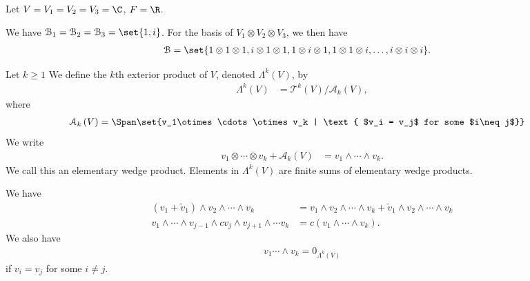 \documentclass[10pt]{mypackage}
\begin{document}
  \begin{example}
    Let $V = V_1 = V_2 = V_3 = \C$, $F = \R$.\newline

    We have $\mathcal{B}_1 = \mathcal{B}_2 =\mathcal{B}_3 = \set{1,i}$. For the basis of $V_1\otimes V_2\otimes V_3$, we then have
    \begin{align*}
      \mathcal{B} &= \set{1\otimes 1\otimes 1,i\otimes 1\otimes 1,1\otimes i \otimes 1, 1\otimes 1\otimes i,\dots,i\otimes i\otimes i}.
    \end{align*}
  \end{example}
  \begin{definition}
    Let $k\geq 1$ We define the $k$th exterior product of $V$, denoted $\Lambda^{k}\left(V\right)$, by
    \begin{align*}
      \Lambda^{k}\left(V\right) &= \mathcal{T}^{k}\left(V\right) / \mathcal{A}_{k}\left(V\right),
    \end{align*}
    where 
    \begin{align*}
      \mathcal{A}_k\left(V\right) &= \Span\set{v_1\otimes\cdots\otimes v_k | \text{ $v_i = v_j$ for some $i\neq j$}}
    \end{align*}
    We write
    \begin{align*}
      v_1\otimes \cdots \otimes v_k + \mathcal{A}_k\left(V\right) &= v_1\wedge\cdots\wedge v_k.
    \end{align*}
    We call this an elementary wedge product. Elements in $\Lambda^{k}\left(V\right)$ are finite sums of elementary wedge products.\newline

    We have
    \begin{align*}
      \left(v_1 + \tilde{v}_1\right)\wedge v_2\wedge\cdots\wedge v_k &= v_1\wedge v_2\wedge \cdots \wedge v_k + \tilde{v}_1 \wedge v_2\wedge \cdots \wedge v_k\\
      v_1\wedge \cdots \wedge v_{j-1}\wedge cv_j \wedge v_{j+1}\wedge \cdots v_{k} &= c\left(v_1\wedge\cdots\wedge v_k\right).
    \end{align*}
    We also have
    \begin{align*}
      v_1\cdots\wedge v_k = 0_{\Lambda^{k}\left(V\right)}
    \end{align*}
    if $v_i = v_j$ for some $i\neq j$.\newline


\end{definition}
\end{document}
